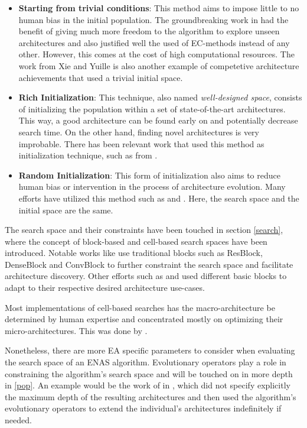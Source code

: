 \documentclass[10pt,        %
               a4paper,     %
               journal,     %
               ]{IEEEtran}
\begin{document}
\begin{itemize}
    \item \textbf{Starting from trivial conditions}: This method aims to impose little to no human bias in the initial
     population. The groundbreaking work in \cite{pmlr-v70-real17a} had the benefit of giving much more freedom to the algorithm
     to explore unseen architectures and also justified well the used of EC-methods instead of any other.
     However, this comes at the cost of high computational resources. The work from Xie and Yuille \cite{xie2017genetic} is
     also another example of competetive architecture achievements that used a trivial initial space.

    \item \textbf{Rich Initialization}: This technique, also named \textit{well-designed space}, consists of initializing
    the population within a set of state-of-the-art architectures. This way, a good architecture can be found early on
    and potentially decrease search time. On the other hand, finding novel architectures is very improbable. There has been
    relevant work that used this method as initialization technique, such as from \cite{fujino2017deep}.

    \item \textbf{Random Initialization}: This form of initialization also aims to reduce human bias or intervention in
     the process of architecture evolution. Many efforts have utilized this method such as \cite{sun2019evolving} and
     \cite{sun2019completely}. Here, the search space and the initial space are the same.
\end{itemize}

The search space and their constraints have been touched in section \ref{search}, where the concept of block-based and cell-based
search spaces have been introduced. Notable works like \cite{sun2019completely} use traditional blocks such as ResBlock, DenseBlock
and ConvBlock to further constraint the search space and facilitate architecture discovery. Other efforts such as
\cite{chen2019auto} and \cite{song2020efficient} used different basic blocks to adapt to their respective desired architecture
use-cases.

Most implementations of cell-based searches has the macro-architecture be determined by human expertise and concentrated mostly
on optimizing their micro-architectures. This was done by \cite{real2019regularized}.

Nonetheless, there are more EA specific
parameters to consider when evaluating the search space of an ENAS algorithm. Evolutionary operators play a role in
constraining the algorithm's search space and will be touched on in more depth in \ref{pop}. An example would be the
work of in \cite{irwin2019graph}, which did not specify explicitly the maximum depth of the
resulting architectures and then used the algorithm's evolutionary operators to extend the individual's architectures
indefinitely if needed.
\end{document}
